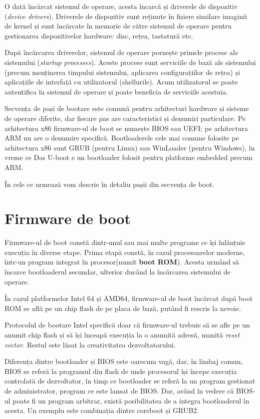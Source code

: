 O dată încărcat sistemul de operare, acesta încarcă și driverele de dispozitiv (\textit{device drivers}).
Driverele de dispozitiv sunt reținute în fișiere similare imaginii de kernel și sunt încărcate în memorie de către sistemul de operare pentru gestionarea dispozitivelor hardware: disc, rețea, tastatură etc.

După încărcarea driverelor, sistemul de operare pornește primele procese ale sistemului (\textit{startup processes}).
Aceste procese sunt serviciile de bază ale sistemului (precum menținerea timpului sistemului, aplicarea configurațiilor de rețea) și aplicațiile de interfață cu utilizatorul (shellurile).
Acum utilizatorul se poate autentifica în sistemul de operare și poate beneficia de serviciile acestuia.

Secvența de pași de bootare este comună pentru arhitecturi hardware și sisteme de operare diferite, dar fiecare pas are caracteristici și denumiri particulare.
 Pe arhitectura x86 firmware-ul de boot se numește BIOS sau UEFI;
pe arhitectura ARM nu are o denumire specifică.
Bootloaderele cele mai comune folosite pe arhitectura x86 sunt GRUB (pentru Linux) sau WinLoader (pentru Windows), în vreme ce Das U-boot e un bootloader folosit pentru platforme embedded precum ARM.

În cele ce urmează vom descrie în detaliu pașii din secvența de boot.

\section{Firmware de boot}
\label{sec:boot:firmware}

Firmware-ul de boot constă dintr-unul sau mai multe programe ce își înlănțuie execuția în diverse etape.
Prima etapă constă, în cazul procesoarelor moderne, într-un program integrat în procesor(numit \textbf{boot ROM}).
Acesta urmând să încarce bootloaderul secundar, ulterior ducând la încărcarea sistemului de operare.

În cazul platformelor Intel 64 și AMD64, firmware-ul de boot încărcat după boot ROM se află pe un chip flash de pe placa de bază, putând fi rescris la nevoie.

Protocolul de bootare Intel specifică doar că firmware-ul trebuie să se afle pe un anumit chip flash și să își înceapă execuția la o anumită adresă, numită \textit{reset vector}.
 Restul este lăsat la creativitatea dezvoltatorului.

Diferența dintre bootloader și BIOS este oarecum vagă, dar, în limbaj comun, BIOS se referă la programul din flash de unde procesorul își începe execuția controlată de dezvoltator, în timp ce bootloader se referă la un program gestionat de administrator, program ce este lansat de BIOS.
Dar, având în vedere că BIOS-ul poate fi un program arbitrar, există posibilitatea de a integra bootloaderul în acesta.
Un exemplu este combinația dintre coreboot și GRUB2.

